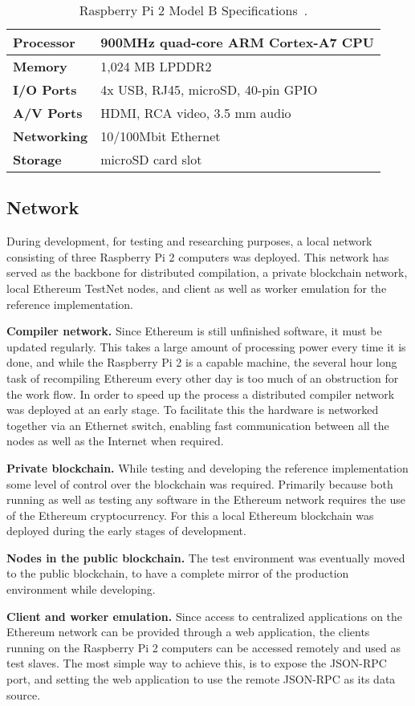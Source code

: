 \begin{table}[h]
\centering
\caption{Raspberry Pi 2 Model B Specifications~\cite{rpi}.}
\label{rpi}
\begin{tabular}{|l|l|}
\hline \textbf{Processor} & 900MHz quad-core ARM Cortex-A7 CPU \\ \hline
\textbf{Memory} & 1,024 MB LPDDR2 \\ \hline 
\textbf{I/O Ports} & 4x USB, RJ45, microSD, 40-pin GPIO \\ \hline
\textbf{A/V Ports} & HDMI, RCA video, 3.5 mm audio \\ \hline
\textbf{Networking} & 10/100Mbit Ethernet \\ \hline
\textbf{Storage} & microSD card slot \\ \hline
\end{tabular}
\end{table}

\subsection{Network}
During development, for testing and researching purposes, a local network consisting of three Raspberry Pi 2 computers was deployed. This network has served as the backbone for distributed compilation, a private blockchain network, local Ethereum TestNet nodes, and client as well as worker emulation for the reference implementation.

\textbf{Compiler network.} Since Ethereum is still unfinished software, it must be updated regularly. This takes a large amount of processing power every time it is done, and while the Raspberry Pi 2 is a capable machine, the several hour long task of recompiling Ethereum every other day is too much of an obstruction for the work flow. In order to speed up the process a distributed compiler network was deployed at an early stage. To facilitate this the hardware is networked together via an Ethernet switch, enabling fast communication between all the nodes as well as the Internet when required. 

\textbf{Private blockchain.} While testing and developing the reference implementation some level of control over the blockchain was required. Primarily because both running as well as testing any software in the Ethereum network requires the use of the Ethereum cryptocurrency. For this a local Ethereum blockchain was deployed during the early stages of development.

\textbf{Nodes in the public blockchain.} The test environment was eventually moved to the public blockchain, to have a complete mirror of the production environment while developing.

\textbf{Client and worker emulation.} Since access to centralized applications on the Ethereum network can be provided through a web application, the clients running on the Raspberry Pi 2 computers can be accessed remotely and used as test slaves. The most simple way to achieve this, is to expose the JSON-RPC port, and setting the web application to use the remote JSON-RPC as its data source.
